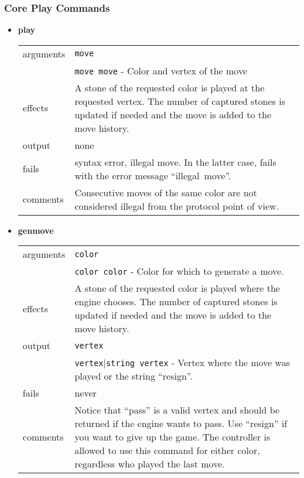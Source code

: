 \documentclass[a4paper]{article}
\begin{document}
\subsubsection{Core Play Commands}
\begin{itemize}
\item \textbf{play} \\
  \begin{tabularx}{\linewidth}{lX}
    arguments & \texttt{move} \\
    & \texttt{move move} - Color and vertex of the move\\
    effects &   A stone of the requested color is played at the requested
                vertex. The number of captured stones is updated if needed 
                and the move is added to the move history. \\
    output &    none \\
    fails &     syntax error, illegal move. In the latter case, fails
                with the error message ``illegal~move''. \\
    comments &  Consecutive moves of the same color are not considered
                illegal from the protocol point of view.
  \end{tabularx}

\newpage
\item \textbf{genmove} \\
  \begin{tabularx}{\linewidth}{lX}
    arguments & \texttt{color} \\
    & \texttt{color color} - Color for which to generate a move. \\
    effects &   A stone of the requested color is played where the engine 
                chooses. The number of captured stones is updated if needed
                and the move is added to the move history. \\
    output &    \texttt{vertex}\\
    & \texttt{vertex$|$string vertex} - Vertex where the move was
                played or the string ``resign''. \\
    fails &     never \\
    comments &  Notice that ``pass'' is a valid vertex and should
                be returned if the engine wants to pass. Use
                ``resign'' if you want to give up the game. The
                controller is allowed to use this command for either
                color, regardless who played the last move.
  \end{tabularx}


\end{itemize}
\end{document}
